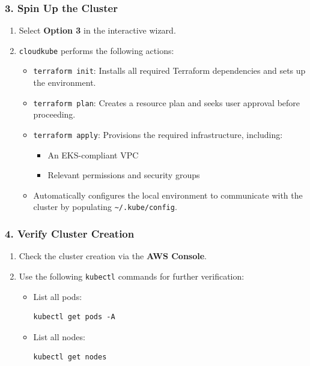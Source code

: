 \subsubsection*{3. Spin Up the Cluster}
\begin{enumerate}[label=\alph*.]
    \item Select \textbf{Option 3} in the interactive wizard.
    \item \texttt{cloudkube} performs the following actions:
          \begin{itemize}
              \item \texttt{terraform init}: Installs all required Terraform dependencies and sets up the environment.
              \item \texttt{terraform plan}: Creates a resource plan and seeks user approval before proceeding.
              \item \texttt{terraform apply}: Provisions the required infrastructure, including:
                    \begin{itemize}
                        \item An EKS-compliant VPC
                        \item Relevant permissions and security groups
                    \end{itemize}
              \item Automatically configures the local environment to communicate with the cluster by populating \texttt{\textasciitilde/.kube/config}.
          \end{itemize}
\end{enumerate}

\subsubsection*{4. Verify Cluster Creation}
\begin{enumerate}[label=\alph*.]
    \item Check the cluster creation via the \textbf{AWS Console}.
    \item Use the following \texttt{kubectl} commands for further verification:
          \begin{itemize}
              \item List all pods:
                    \begin{lstlisting}[xleftmargin=64pt]
kubectl get pods -A
                    \end{lstlisting}
              \item List all nodes:
                    \begin{lstlisting}[xleftmargin=64pt]
kubectl get nodes
                    \end{lstlisting}
          \end{itemize}
\end{enumerate}

